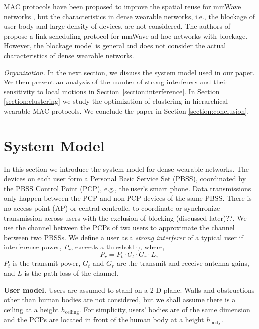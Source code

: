\documentclass[10pt, conference, letterpaper]{IEEEtran}
\begin{document}
MAC protocols have been proposed to improve the spatial reuse for mmWave networks \cite{dtdmac}\cite{mdmac}\cite{intersharing}, but the characteristics in dense wearable networks, i.e., the blockage of user body and large density of devices, are not considered.
The authors of \cite{onlinkscheduling} propose a link scheduling protocol for mmWave ad hoc networks with blockage. However, the blockage model is general and does not consider the actual characteristics of dense wearable networks.

\emph{Organization.}
In the next section, we discuss the system model used in our paper. 
We then present an analysis of the number of strong interferers and their sensitivity to local motions in Section~\ref{section:interference}. 
In Section \ref{section:clustering} we study the optimization of clustering in hierarchical wearable MAC protocols.
We conclude the paper in Section \ref{section:conclusion}.

\section{System Model}
In this section we introduce the system model for dense wearable networks. 
The devices on each user form a Personal Basic Service Set (PBSS), coordinated by the PBSS Control Point (PCP), e.g., the user's smart phone.
Data transmissions only happen between the PCP and non-PCP devices of the same PBSS.
There is no access point (AP) or central controller to coordinate or synchronize transmission across users with the exclusion of blocking (discussed later)??. 
We use the channel between the PCPs of two users to approximate the channel between two PBSSs. 
We define a user as a \emph{strong interferer} of a typical user if interference power, $P_r$, exceeds a threshold $\gamma$, where, 
\begin{equation*}
P_r = P_t\cdot G_t\cdot G_r\cdot L, 
\end{equation*}
$P_t$ is the transmit power, $G_t$ and $G_r$ are the transmit and receive antenna gains, and $L$ is the path loss of the channel.

\textbf{User model.} Users are assumed to stand on a 2-D plane. 
Walls and obstructions other than human bodies are not considered, but we shall assume there is a ceiling at a height $h_{\mathrm{ceiling}}$. 
For simplicity, users' bodies are of the same dimension and the PCPs are located in front of the human body at a height $h_{\mathrm{body}}$. 
\end{document}
